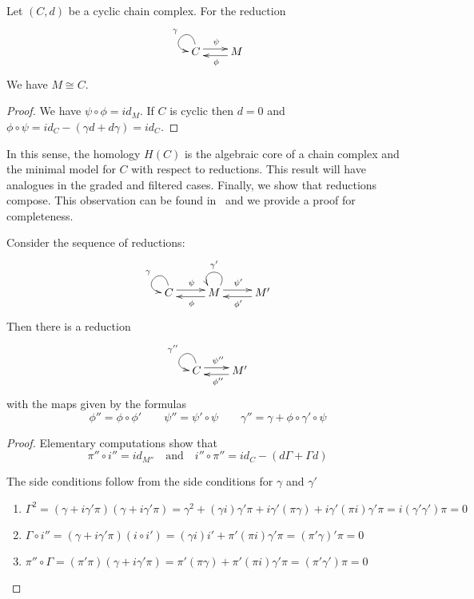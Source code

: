 \begin{prop}\label{prop:cont:cyclic}
Let $(C,d)$ be a cyclic chain complex. For the reduction
\[
\xymatrixrowsep{0.03in}
\xymatrixcolsep{0.3in}
\xymatrix{
C  \ar@(u,l)_{\gamma}  \ar[r]<3pt>^{\psi} & \ar[l]<3pt>^{\phi} M
}
\]
We have $M\cong C$.
\end{prop}
\begin{proof}
We have $\psi \circ \phi  = id_M$.  If $C$ is cyclic then $d=0$ and $\phi\circ\psi = id_C-(\gamma d+d\gamma) = id_C$.
\end{proof}

In this sense, the homology $H(C)$ is the algebraic core of a chain complex and the minimal model for $C$ with respect to reductions.  This result will have analogues in the graded and filtered cases.  Finally, we show that reductions compose.  This observation can be found in~\cite{} and we provide a proof for completeness.

\begin{prop}
Consider the sequence of reductions:
\[
\xymatrixrowsep{0.03in}
\xymatrixcolsep{0.35in}
\xymatrix{
C\ar@(u,l)_{\gamma} \ar[r]<3pt>^{\psi } & \ar[l]<3pt>^{\phi} M \ar@(ur,ul)_{\gamma'}  \ar[r]<3pt>^{\psi '} & \ar[l]<3pt>^{\phi'} M' 
}
\]
Then there is a reduction 
\[
\xymatrixrowsep{0.03in}
\xymatrixcolsep{0.3in}
\xymatrix{
C  \ar@(u,l)_{\gamma''}  \ar[r]<3pt>^{\psi'' } & \ar[l]<3pt>^{\phi'' } M'
}
\]
with the maps given by the formulas
\[
\phi'' = \phi \circ \phi ' \quad\quad \psi'' = \psi'\circ  \psi \quad\quad \gamma'' = \gamma + \phi \circ \gamma '\circ \psi
\]

\end{prop}
\begin{proof}
Elementary computations show that 
\[
\pi''\circ i'' = id_{M''}\quad\text{and}\quad i'' \circ \pi'' = id_C-(d\Gamma + \Gamma d)
\]

The side conditions follow from the side conditions for $\gamma$ and $\gamma'$
\begin{enumerate}
\item  $\Gamma^2 = (\gamma+i\gamma'\pi)(\gamma+i\gamma'\pi) = \gamma^2 +  (\gamma i)\gamma'\pi + i\gamma'(\pi\gamma)  + i\gamma' (\pi i)\gamma'\pi = i (\gamma'\gamma' )\pi = 0$
\item $ \Gamma \circ i'' = (\gamma + i\gamma'\pi)(i\circ i') = (\gamma i)i'  + \pi' (\pi i)\gamma '\pi =  (\pi'\gamma) '\pi = 0$
\item $\pi''\circ \Gamma = (\pi'\pi)(\gamma+i\gamma'\pi) = \pi' (\pi\gamma) + \pi'( \pi i) \gamma'\pi = (\pi'\gamma' )\pi = 0$
\end{enumerate}

\end{proof}

